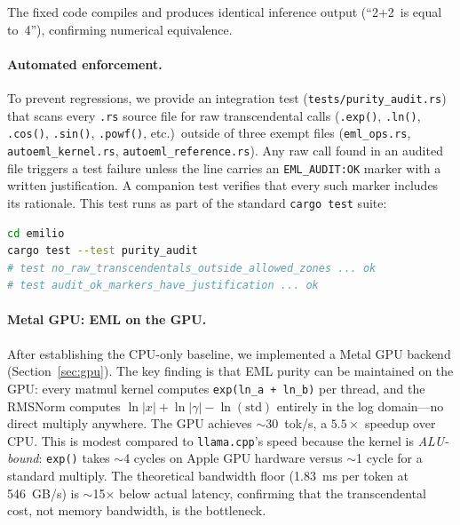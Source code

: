 \documentclass[acmsmall,nonacm]{acmart}
\begin{document}
The fixed code compiles and produces identical inference output
(``2+2~is equal to~4''), confirming numerical equivalence.

\paragraph{Automated enforcement.}
To prevent regressions, we provide an integration test
(\texttt{tests/\allowbreak purity\_audit.rs}) that scans every \texttt{.rs} source
file for raw transcendental calls (\texttt{.exp()}, \texttt{.ln()},
\texttt{.cos()}, \texttt{.sin()}, \texttt{.powf()}, etc.)\ outside of
three exempt files (\texttt{eml\_ops.rs}, \texttt{autoeml\_kernel.rs},
\texttt{autoeml\_reference.rs}).  Any raw call found in an audited file
triggers a test failure unless the line carries an
\texttt{EML\_AUDIT:\allowbreak OK} marker with a written justification.  A
companion test verifies that every such marker includes its rationale.
This test runs as part of the standard \texttt{cargo test} suite:

\begin{lstlisting}[language=bash,caption={Running the purity audit.}]
cd emilio
cargo test --test purity_audit
# test no_raw_transcendentals_outside_allowed_zones ... ok
# test audit_ok_markers_have_justification ... ok
\end{lstlisting}

\paragraph{Metal GPU: EML on the GPU.}
After establishing the CPU-only baseline, we implemented a Metal GPU
backend (Section~\ref{sec:gpu}).  The key finding is that EML purity
can be maintained on the GPU: every matmul kernel computes
\texttt{exp(ln\_a + ln\_b)} per thread, and the RMSNorm computes
$\ln|x| + \ln|\gamma| - \ln(\mathrm{std})$ entirely in the log
domain---no direct multiply anywhere.  The GPU achieves
$\sim$30~tok/s, a $5.5\times$ speedup over CPU.  This is modest
compared to \texttt{llama.cpp}'s speed because the kernel is
\emph{ALU-bound}: \texttt{exp()} takes $\sim$4 cycles on Apple GPU
hardware versus $\sim$1 cycle for a standard multiply.  The theoretical
bandwidth floor (1.83~ms per token at 546~GB/s) is $\sim$15$\times$
below actual latency, confirming that the transcendental cost, not
memory bandwidth, is the bottleneck.
\end{document}
